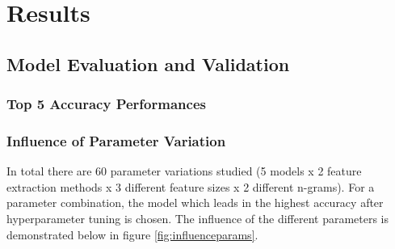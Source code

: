 \documentclass[a4paper,12pt,nottoc]{article}
\begin{document}
\clearpage
\section{Results}

\subsection{Model Evaluation and Validation}

\subsubsection{Top 5 Accuracy Performances}

\subsubsection{Influence of Parameter Variation}

In total there are 60 parameter variations studied (5 models x 2 feature extraction methods x 3 different feature sizes x 2 different n-grams). For a parameter combination, the model which leads in the highest accuracy after hyperparameter tuning is chosen. The influence of the different parameters is demonstrated below in figure \ref{fig:influenceparams}.
\end{document}

